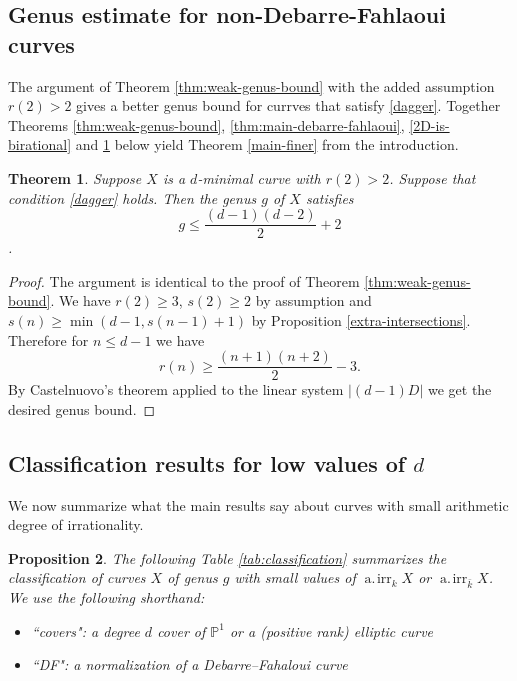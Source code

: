 \documentclass[11pt]{amsart}
\newcommand{\pp}{\mathbb{P}}
\newcommand{\airr}{\operatorname{a.\!irr}}
\newtheorem{theorem}{Theorem}[section]
\newtheorem{proposition}[theorem]{Proposition}
\theoremstyle{definition}
\theoremstyle{remark}
\begin{document}
\subsection{Genus estimate for non-Debarre-Fahlaoui curves}
The argument of Theorem \ref{thm:weak-genus-bound} with the added assumption
 $r(2)>2$  gives a better genus bound for currves that satisfy \eqref{dagger}. Together Theorems \ref{thm:weak-genus-bound}, \ref{thm:main-debarre-fahlaoui}, \ref{2D-is-birational} and \ref{thm:genus-non-DF} below yield Theorem \ref{main-finer} from the introduction.
\begin{theorem}\label{thm:genus-non-DF}
Suppose $X$ is a $d$-minimal curve with $r(2)>2$. Suppose that condition \eqref{dagger} holds. Then the genus $g$ of $X$ satisfies \[g \leqslant \frac{(d-1)(d-2)}{2}+2\].
\end{theorem}
\begin{proof}
The argument is identical to the proof of Theorem \ref{thm:weak-genus-bound}. We have $r(2) \geqslant 3$, $s(2)\geqslant 2$ by assumption and $s(n) \geqslant \min(d-1, s(n-1)+1)$ by Proposition \ref{extra-intersections}. Therefore for $n\leqslant d - 1$ we have \[r(n) \geqslant \frac{(n+1)(n+2)}{2}-3.\]
By Castelnuovo's theorem applied to the linear system $|(d-1)D|$ we get the desired genus bound.
\end{proof}
\subsection{Classification results for low values of \texorpdfstring{$d$}{d}}\label{sec:small-airr}

We now summarize what the main results say about curves with small arithmetic degree of irrationality.

\begin{proposition}\label{prop:small-numbers}
The following Table \ref{tab:classification} summarizes the classification of curves \(X\) of genus \(g\) with small values of \(\airr_k X\) or \(\airr_{\bar{k}}X\).  We use the following shorthand:
\begin{itemize}
\item ``covers": a degree \(d\) cover of \(\pp^1\) or a (positive rank) elliptic curve
\item ``DF": a normalization of a Debarre--Fahaloui curve
\end{itemize}
\end{proposition}
\end{document}
